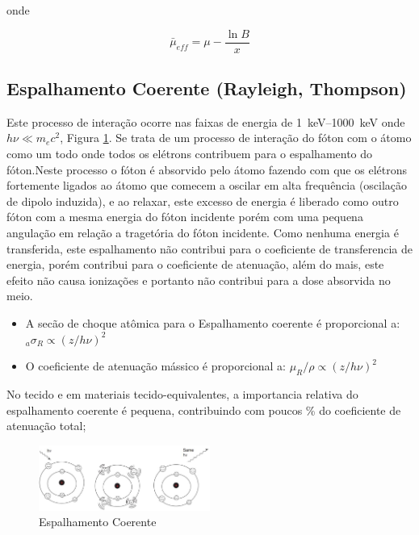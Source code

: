 \documentclass[11pt,a4paper]{article}
\begin{document}
            \noindent onde

                \begin{equation}
                    \bar{\mu}_{eff} = \mu - \frac{\ln B}{x}
                \end{equation}




        \subsection{Espalhamento Coerente (Rayleigh, Thompson)}

            Este processo de interação ocorre nas faixas de energia de \qtyrange{1}{1000}{keV} onde $h\nu \ll m_ec^2$, Figura \ref{fig:espalhamentoCoerente}. Se trata de um processo de interação do fóton com o átomo como um todo onde todos os elétrons contribuem para o espalhamento do fóton.Neste processo o fóton é absorvido pelo átomo fazendo com que os elétrons fortemente ligados ao átomo que comecem a oscilar em alta frequência (oscilação de dipolo induzida), e ao relaxar, este excesso de energia é liberado como outro fóton com a mesma energia do fóton incidente porém com uma pequena angulação em relação a tragetória do fóton incidente. Como nenhuma energia é transferida, este espalhamento não contribui para o coeficiente de transferencia de energia, porém contribui para o coeficiente de atenuação, além do mais, este efeito não causa ionizações e portanto não contribui para a dose absorvida no meio.

            \begin{itemize}
                \item A secão de choque atômica para o Espalhamento coerente é proporcional a:  ${}_a\sigma_R \propto (z / h\nu)^2$
                \item O coeficiente de atenuação mássico é proporcional a: $\mu_R / \rho \propto (z / h\nu)^2$
            \end{itemize}

            No tecido e em materiais tecido-equivalentes, a importancia relativa do espalhamento coerente é pequena, contribuindo com poucos \% do coeficiente de atenuação total;

            \begin{figure}[h]
                \centering
                \includegraphics[width=0.5\textwidth]{Imagens/espalhamentoCoerente.JPG}
                \caption{Espalhamento Coerente}
                \label{fig:espalhamentoCoerente}
            \end{figure}
\end{document}
